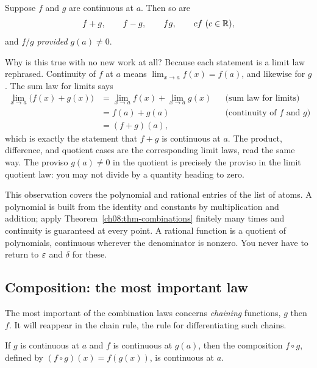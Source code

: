 \begin{theorem}
\label{ch08:thm-combinations}
Suppose $f$ and $g$ are continuous at $a$. Then so are
\[
  f+g,\qquad f-g,\qquad fg,\qquad cf \ (c\in\mathbb{R}),
\]
and $f/g$ \emph{provided} $g(a)\ne 0$.
\end{theorem}

\begin{whybox}
Why is this true with no new work at all? Because each statement is a limit law
rephrased. Continuity of $f$ at $a$ means $\lim_{x\to a}f(x)=f(a)$, and likewise for $g$.
The sum law for limits says
\begin{align*}
  \lim_{x\to a}\bigl(f(x)+g(x)\bigr)
    &=\lim_{x\to a}f(x)+\lim_{x\to a}g(x) && \text{(sum law for limits)}\\
    &=f(a)+g(a)                           && \text{(continuity of $f$ and $g$)}\\
    &=(f+g)(a),
\end{align*}
which is exactly the statement that $f+g$ is continuous at $a$. The product, difference,
and quotient cases are the corresponding limit laws, read the same way. The proviso
$g(a)\ne 0$ in the quotient is precisely the proviso in the limit quotient law: you may
not divide by a quantity heading to zero.
\end{whybox}

This observation covers the polynomial and rational entries of the list of atoms. A
polynomial is built from the
identity and constants by multiplication and addition; apply Theorem~\ref{ch08:thm-combinations}
finitely many times and continuity is guaranteed at every point. A rational function is a
quotient of polynomials, continuous wherever the denominator is nonzero. You never have to
return to $\varepsilon$ and $\delta$ for these.

\subsection{Composition: the most important law}

The most important of the combination laws concerns \emph{chaining} functions, $g$ then $f$. It
will reappear in the chain rule, the rule for differentiating such chains.

\begin{theorem}
\label{ch08:thm-composition}
If $g$ is continuous at $a$ and $f$ is continuous at $g(a)$, then the composition
$f\circ g$, defined by $(f\circ g)(x)=f(g(x))$, is continuous at $a$.
\end{theorem}

